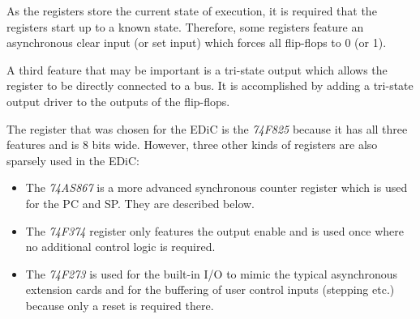 
As the registers store the current state of execution, it is required that the registers start up to a known state.
Therefore, some registers feature an asynchronous clear input (or set input) which forces all flip-flops to 0 (or 1).

A third feature that may be important is a tri-state output which allows the register to be directly connected to a bus.
It is accomplished by adding a tri-state output driver to the outputs of the flip-flops.

The register that was chosen for the \gls{EDiC} is the \emph{74F825} because it has all three features and is 8 bits wide.
However, three other kinds of registers are also sparsely used in the \gls{EDiC}:
\begin{itemize}
  \item The \emph{74AS867} is a more advanced synchronous counter register which is used for the \gls{PC} and \gls{SP}. They are described below.
  \item The \emph{74F374} register only features the output enable and is used once where no additional control logic is required.
  \item The \emph{74F273} is used for the built-in I/O to mimic the typical asynchronous extension cards and for the buffering of user control inputs (stepping etc.) because only a reset is required there.
\end{itemize}


